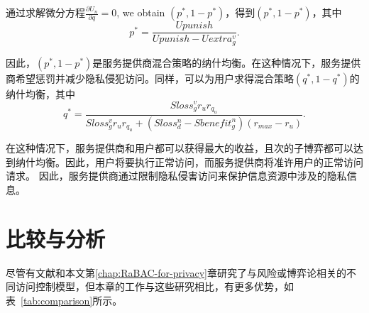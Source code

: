 通过求解微分方程$\frac{\partial U_n}{\partial q}=0$, we obtain $(p^*,1-p^*)$，得到$(p^*,1-p^*)$，其中
\begin{equation}
p^*=\dfrac{Upunish}{Upunish-Uextra_g^v}.
\end{equation}

因此，$(p^*,1-p^*)$是服务提供商混合策略的纳什均衡。在这种情况下，服务提供商希望惩罚并减少隐私侵犯访问。同样，可以为用户求得混合策略$(q^*,1-q^*)$的纳什均衡，其中
\begin{equation}
q^*=\dfrac{Sloss_g^v r_u r_{q_u}}{Sloss_g^v r_u  r_{q_u} +(Sloss_d^n -Sbenefit_g^n)(r_{max}-r_u)}.
\end{equation}

在这种情况下，服务提供商和用户都可以获得最大的收益，且次的子博弈都可以达到纳什均衡。因此，用户将要执行正常访问，而服务提供商将准许用户的正常访问请求。 因此，服务提供商通过限制隐私侵害访问来保护信息资源中涉及的隐私信息。

\section{比较与分析}
\label{sec:comparison}

尽管有文献\cite{ni2010risk,wang2011quantified,shaikh2012dynamic,santos2016framework,wang2019game,zhang2015towards,zhen2015risk,zhang2018privacy,gao2018game,liu2016dynamic,helil2017non,hu2014game}和本文第\ref{chap:RaBAC-for-privacy}章研究了与风险或博弈论相关的不同访问控制模型，但本章的工作与这些研究相比，有更多优势，如表~\ref{tab:comparison}所示。

